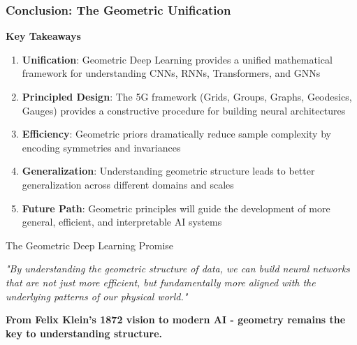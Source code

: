 \begin{frame}[fragile]\frametitle{Conclusion: The Geometric Unification}

\begin{center}
\textbf{Key Takeaways}
\end{center}

\begin{enumerate}
\item \textbf{Unification}: Geometric Deep Learning provides a unified mathematical framework for understanding CNNs, RNNs, Transformers, and GNNs

\item \textbf{Principled Design}: The 5G framework (Grids, Groups, Graphs, Geodesics, Gauges) provides a constructive procedure for building neural architectures

\item \textbf{Efficiency}: Geometric priors dramatically reduce sample complexity by encoding symmetries and invariances

\item \textbf{Generalization}: Understanding geometric structure leads to better generalization across different domains and scales

\item \textbf{Future Path}: Geometric principles will guide the development of more general, efficient, and interpretable AI systems
\end{enumerate}

\vspace{0.5cm}

\begin{block}{The Geometric Deep Learning Promise}
\begin{center}
{\em "By understanding the geometric structure of data, we can build neural networks that are not just more efficient, but fundamentally more aligned with the underlying patterns of our physical world."}
\end{center}
\end{block}

\vspace{0.5cm}

\begin{center}
\textbf{From Felix Klein's 1872 vision to modern AI - geometry remains the key to understanding structure.}
\end{center}

\end{frame}

